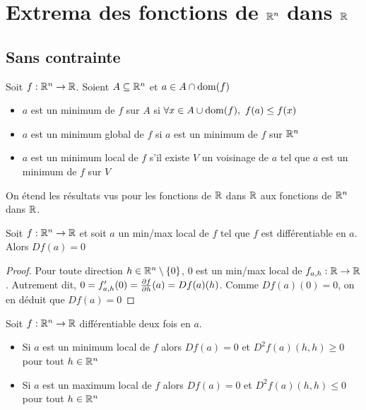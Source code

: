 \chapter{Extrema des fonctions de $\mathbb{R}^n$ dans $\mathbb{R}$}
\section{Sans contrainte}
\begin{definition}
    Soit $f: \mathbb{R}^n\to\mathbb{R}$. Soient $A\subseteq\mathbb{R}^n$ et $a\in A\cap\operatorname{dom} (f)$
    \begin{itemize}
        \item $a$ est un minimum de $f$ sur $A$ si $\forall x\in A\cup\operatorname{dom} (f),\ f(a)\le f(x)$
        \item $a$ est un minimum global de $f$ si $a$ est un minimum de $f$ sur $\mathbb{R}^n$
        \item $a$ est un minimum local de $f$ s'il existe $V$ un voisinage de $a$ tel que $a$ est un minimum de $f$ sur $V$
    \end{itemize}
\end{definition}
On étend les résultats vus pour les fonctions de $\mathbb{R}$ dans $\mathbb{R}$ aux fonctions de $\mathbb{R}^n$ dans $\mathbb{R}$.
\begin{proposition}
    Soit $f:\mathbb{R}^n\to\mathbb{R}$ et soit $a$ un min/max local de $f$ tel que $f$ est différentiable en $a$. Alors $Df(a) = 0$
\end{proposition}
\begin{proof}
    Pour toute direction $h\in\mathbb{R}^n\setminus\{0\}$, $0$ est un min/max local de $f_{a,h}:\mathbb{R}\to\mathbb{R}$. Autrement dit, $0 = f'_{a,h}(0) = \frac{\partial f}{\partial h}(a) = Df(a)(h)$. Comme $Df(a)(0) = 0$, on en déduit que $Df(a) = 0$
\end{proof}
\begin{proposition}
    Soit $f:\mathbb{R}^n\to\mathbb{R}$ différentiable deux fois en $a$. 
    \begin{itemize}
        \item Si $a$ est un minimum local de $f$ alors $Df(a) = 0$ et $D^2f(a)(h,h)\ge 0$ pour tout $h\in\mathbb{R}^n$
        \item Si $a$ est un maximum local de $f$ alors $Df(a) = 0$ et $D^2f(a)(h,h)\le 0$ pour tout $h\in\mathbb{R}^n$
    \end{itemize}
\end{proposition}
